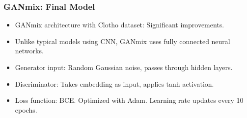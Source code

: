 \begin{frame}
    \frametitle{GANmix: Final Model}

    \begin{itemize}
        \item GANmix architecture with Clotho dataset: Significant improvements.
        \item Unlike typical models using CNN, GANmix uses fully connected neural networks.
        \item Generator input: Random Gaussian noise, passes through hidden layers.
        \item Discriminator: Takes embedding as input, applies tanh activation.
        \item Loss function: BCE. Optimized with Adam. Learning rate updates every 10 epochs.
    \end{itemize}
\end{frame}